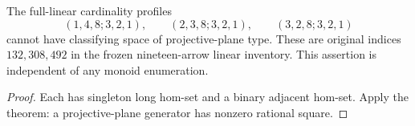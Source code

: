 \begin{corollary}
\label{CP2:A-linear19-three-binary-long-large-profiles}
The full-linear cardinality profiles
\[
 (1,4,8;3,2,1),\qquad
 (2,3,8;3,2,1),\qquad
 (3,2,8;3,2,1)
\]
cannot have classifying space of projective-plane type.
These are original indices $132,308,492$ in the frozen
nineteen-arrow linear inventory.  This assertion is
independent of any monoid enumeration.
\end{corollary}
\begin{proof}
Each has singleton long hom-set and a binary adjacent
hom-set.  Apply the theorem: a projective-plane generator
has nonzero rational square.
\end{proof}
